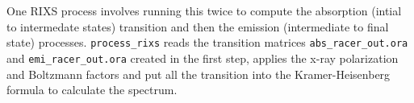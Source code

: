 \documentclass[aps,onecolumn, notitlepage, longbibliography]{revtex4-1}
\begin{document}
One RIXS process involves running this twice to compute the absorption (intial to intermedate states) transition and then the emission (intermediate to final state) processes. \texttt{process\_rixs} reads the transition matrices \texttt{abs\_racer\_out.ora} and \texttt{emi\_racer\_out.ora} created in the first step, applies the x-ray polarization and Boltzmann factors and put all the transition into the Kramer-Heisenberg formula to calculate the spectrum. 


\end{document}
